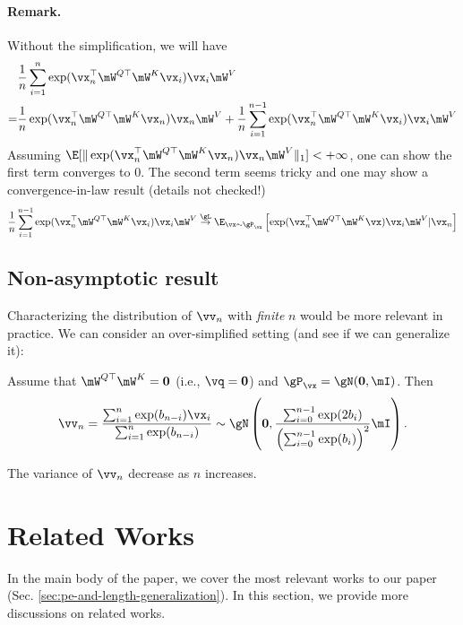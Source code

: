 \paragraph{Remark.} Without the simplification, we will have
\begin{align}
    &\frac{1}{n} \sum_{i = 1}^n \exp(\vx_n^{\top}\mW^{Q\top}\mW^K\vx_i) \vx_i\mW^V \\
    = & \frac{1}{n} \exp(\vx_n^{\top}\mW^{Q\top}\mW^K\vx_n) \vx_n\mW^V +\frac{1}{n} \sum_{i = 1}^{n-1} \exp(\vx_n^{\top}\mW^{Q\top}\mW^K\vx_i) \vx_i\mW^V
\end{align}
Assuming $\E[\|\exp(\vx_n^{\top}\mW^{Q\top}\mW^K\vx_n) \vx_n\mW^V \|_1]<+\infty$, one can show the first term converges to 0. The second term seems tricky and one may show a convergence-in-law result (details not checked!)
\begin{equation}
    \frac{1}{n} \sum_{i = 1}^{n-1} \exp(\vx_n^{\top}\mW^{Q\top}\mW^K\vx_i) \vx_i\mW^V \overset{\gL}{\to} \E_{\vx\sim \gP_{\vx}}\left[ \exp(\vx_n^{\top}\mW^{Q\top}\mW^K\vx)\vx_i\mW^V | \vx_n\right] 
\end{equation}

\subsection{Non-asymptotic result}
Characterizing the distribution of $\vv_n$ with \textit{finite} $n$ would be more relevant in practice. We can consider an over-simplified setting (and see if we can generalize it):

Assume that $\mW^{Q\top}\mW^K=\mathbf{0}$ (i.e., $\vq=\mathbf{0}$) and $\gP_{\vx}=\gN(\mathbf{0}, \mI)$. Then
\begin{equation}
    \vv_n=\frac{\sum_{i = 1}^n\exp(b_{n-i}) \vx_i}{\sum_{i = 1}^n \exp(b_{n-i})}\sim \gN\left(\mathbf{0}, \frac{\sum_{i=0}^{n-1}\exp(2b_i)}{\left(\sum_{i=0}^{n-1}\exp(b_i)\right)^2}\mI\right).
\end{equation}

The variance of $\vv_n$ decrease as $n$ increases. 

\section{Related Works}
\label{app:related}
In the main body of the paper, we cover the most relevant works to our paper (Sec. \ref{sec:pe-and-length-generalization}). In this section, we provide more discussions on related works.

